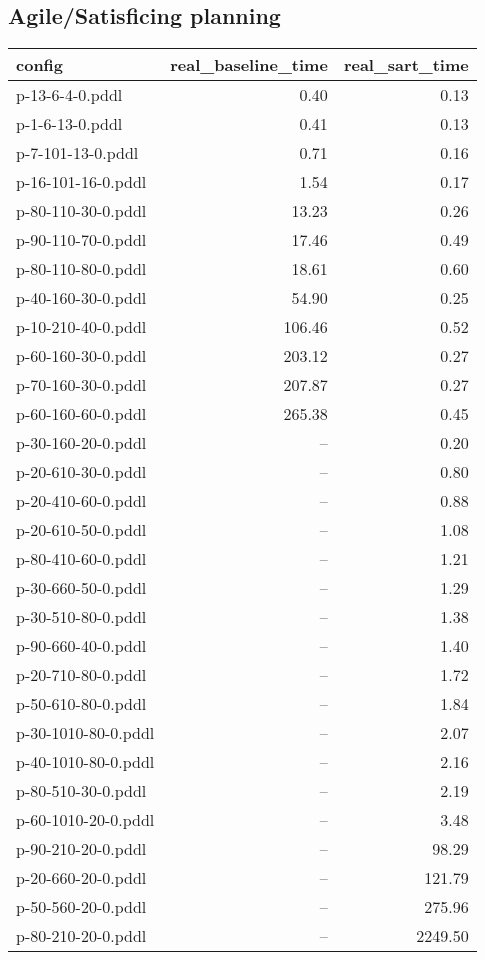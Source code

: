 \documentclass{article}
\begin{document}
                    \subsection*{Agile/Satisficing planning}
                    
                            \begin{center}
                            \scriptsize
                            \begin{tabular}{@{}l|r|r@{}}
                            config & real\_baseline\_time & real\_sart\_time\\\midrule
                             p-13-6-4-0.pddl&0.40&0.13\\
 p-1-6-13-0.pddl&0.41&0.13\\
 p-7-101-13-0.pddl&0.71&0.16\\
 p-16-101-16-0.pddl&1.54&0.17\\
 p-80-110-30-0.pddl&13.23&0.26\\
 p-90-110-70-0.pddl&17.46&0.49\\
 p-80-110-80-0.pddl&18.61&0.60\\
 p-40-160-30-0.pddl&54.90&0.25\\
 p-10-210-40-0.pddl&106.46&0.52\\
 p-60-160-30-0.pddl&203.12&0.27\\
 p-70-160-30-0.pddl&207.87&0.27\\
 p-60-160-60-0.pddl&265.38&0.45\\
 p-30-160-20-0.pddl&--&0.20\\
 p-20-610-30-0.pddl&--&0.80\\
 p-20-410-60-0.pddl&--&0.88\\
 p-20-610-50-0.pddl&--&1.08\\
 p-80-410-60-0.pddl&--&1.21\\
 p-30-660-50-0.pddl&--&1.29\\
 p-30-510-80-0.pddl&--&1.38\\
 p-90-660-40-0.pddl&--&1.40\\
 p-20-710-80-0.pddl&--&1.72\\
 p-50-610-80-0.pddl&--&1.84\\
 p-30-1010-80-0.pddl&--&2.07\\
 p-40-1010-80-0.pddl&--&2.16\\
 p-80-510-30-0.pddl&--&2.19\\
 p-60-1010-20-0.pddl&--&3.48\\
 p-90-210-20-0.pddl&--&98.29\\
 p-20-660-20-0.pddl&--&121.79\\
 p-50-560-20-0.pddl&--&275.96\\
 p-80-210-20-0.pddl&--&2249.50
                            \end{tabular}
                            \end{center}
                    
\end{document}
